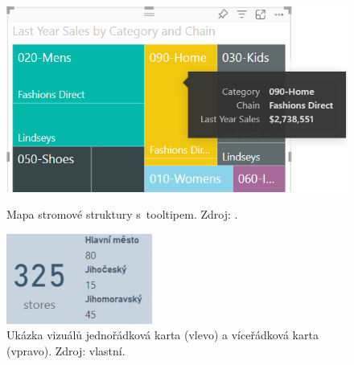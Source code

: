 \begin{figure}[hbtp!]
    \centering
    \begin{minipage}{.4\textwidth}
        \centering
        \captionsetup{justification=centering}
        \includegraphics[width=\textwidth]{obrazky/PBIteorie/power-bi-treemap-category-tooltip.png}
        \caption{Mapa stromové struktury s~tooltipem. Zdroj: \cite{bib:PBI}.}
        \label{obr:PBImapa}
    \end{minipage}%
    \hspace*{0.4em}
    \begin{minipage}{.2\textwidth}
        \centering
        \captionsetup{justification=centering}
        \includegraphics[width=\textwidth]{obrazky/PBIteorie/kartastoresSFF.png}
        \caption{Ukázka vizuálů jednořádková karta (vlevo) a víceřádková karta (vpravo). Zdroj: vlastní.}
        \label{obr:PBIkarty}
    \end{minipage}%
    \hspace*{0.4em}
    \begin{minipage}{.4\textwidth}
        \centering
        \captionsetup{justification=centering}

\end{minipage}
\end{figure}
